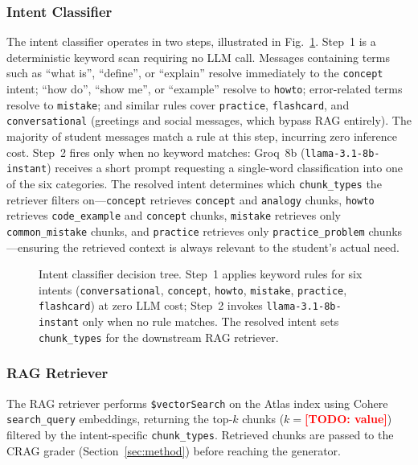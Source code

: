 \documentclass[conference]{IEEEtran}
\newcommand{\todo}[1]{\textcolor{red}{\textbf{[TODO: #1]}}}
\begin{document}
\subsubsection{Intent Classifier}
The intent classifier operates in two steps, illustrated in
Fig.~\ref{fig:intent}.
Step~1 is a deterministic keyword scan requiring no LLM call.
Messages containing terms such as ``what is'', ``define'', or
``explain'' resolve immediately to the \texttt{concept} intent;
``how do'', ``show me'', or ``example'' resolve to \texttt{howto};
error-related terms resolve to \texttt{mistake}; and similar rules
cover \texttt{practice}, \texttt{flashcard}, and
\texttt{conversational} (greetings and social messages, which bypass
RAG entirely).
The majority of student messages match a rule at this step, incurring
zero inference cost.
Step~2 fires only when no keyword matches: Groq~8b
(\texttt{llama-3.1-8b-instant}) receives a short prompt requesting a
single-word classification into one of the six categories.
The resolved intent determines which \texttt{chunk\_types} the
retriever filters on---\texttt{concept} retrieves \texttt{concept}
and \texttt{analogy} chunks, \texttt{howto} retrieves
\texttt{code\_example} and \texttt{concept} chunks,
\texttt{mistake} retrieves only \texttt{common\_mistake} chunks, and
\texttt{practice} retrieves only \texttt{practice\_problem}
chunks---ensuring the retrieved context is always relevant to the
student's actual need.

\begin{figure}[htbp]
  \centering
  \fbox{\rule{0pt}{4.2cm}\rule{\dimexpr\columnwidth-2\fboxsep\relax}{0pt}}
  \caption{Intent classifier decision tree. Step~1 applies keyword
  rules for six intents (\texttt{conversational}, \texttt{concept},
  \texttt{howto}, \texttt{mistake}, \texttt{practice},
  \texttt{flashcard}) at zero LLM cost; Step~2 invokes
  \texttt{llama-3.1-8b-instant} only when no rule matches.
  The resolved intent sets \texttt{chunk\_types} for the
  downstream RAG retriever.}
  \label{fig:intent}
\end{figure}

\subsubsection{RAG Retriever}
The RAG retriever performs \texttt{\$vectorSearch} on the Atlas
index using Cohere \texttt{search\_query} embeddings, returning the
top-$k$ chunks (\(k=\)\todo{value}) filtered by the intent-specific
\texttt{chunk\_types}.
Retrieved chunks are passed to the CRAG grader
(Section~\ref{sec:method}) before reaching the generator.
\end{document}
